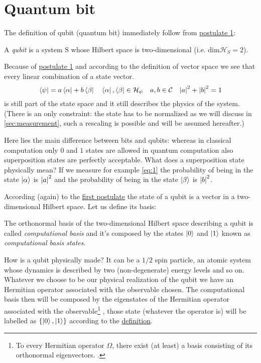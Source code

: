 \section{Quantum bit}
The definition of qubit (quantum bit) immediately follow from \hyperref[postulate:1]{postulate 1}:
\begin{defn}
A \emph{qubit} is a system S whose Hilbert space is two-dimensional (i.e. $\text{dim}\mathcal{H}_S = 2$).
\end{defn}
Because of \hyperref[postulate:1]{postulate 1} and according to the definition of vector space we see that every linear combination of a state vector.
\begin{equation}\label{eq:1}
    \bra{\psi} = a \bra{\alpha} + b \bra{\beta} \quad \bra{\alpha},\bra{\beta} \in \mathcal{H}_\psi \quad a,b \in \mathcal{C} \quad \abs{a}^2 + \abs{b}^2 = 1
\end{equation}
is still part of the state space and it still describes the physics of the system. (There is an only constraint: the state has to be normalized as we will discuss in \ref{sec:measurement}, such a rescaling is possible and will be assumed hereafter.) 

Here lies the main difference between bits and qubits: whereas in classical computation only $0$ and $1$ states are allowed in quantum computation also superposition states are perfectly acceptable. What does a superposition state physically mean? If we measure for example \ref{eq:1} the probability of being in the state $\ket{\alpha}$ is  $\abs{a}^2$ and the probability of being in the state $\ket{\beta}$ is $\abs{b}^2$.

According (again) to the \hyperref[postulate:1]{first postulate} the state of a qubit is a vector in a two-dimensional Hilbert space. Let us define its basis:
\begin{defn}\label{def:computational-basis}
The orthonormal basis of the two-dimensional Hilbert space describing a qubit is called \emph{computational basis} and it's composed by the states $\ket{0}$ and $\ket{1}$ known as \emph{computational basis states}.
\end{defn}
How is a qubit physically made?
It can be a $1/2$ spin particle, an atomic system whose dynamics is described by two (non-degenerate) energy levels and so on.
Whatever we choose to be our physical realization of the qubit we have an Hermitian operator associated with the observable chosen. The computational basis then will be composed by the eigenstates of the Hermitian operator associated with the observable\footnote{To every Hermitian operator $\Omega$, there exist (at least) a basis consisting of its orthonormal eigenvectors. \cite[p.36]{Shankar}.} , those state (whatever the operator is) will be labelled as $\{\ket{0},\ket{1}\}$ according to the \hyperref[def:computational-basis]{definition}.

